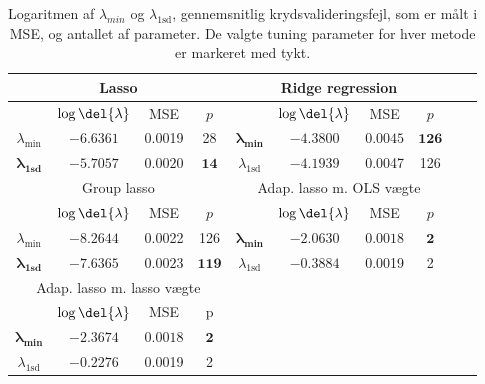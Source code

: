 \begin{table}[ht]
\center
\begin{tabular}{cccc | cccccc}
\toprule
   \multicolumn{4}{c}{Lasso} &  \multicolumn{4}{c}{Ridge regression}  \\ \midrule
 & \(\log \del{\lambda}\) & MSE & $p$ & & \(\log \del{\lambda}\) & MSE & $p$ \\
 $\lambda_{\min}$ &$-6.6361$& 0.0019 & 28 & $\boldsymbol{\lambda_{\min}}$ &  $\mathbf{-4.3800}$ &   $\mathbf{0.0045} $&  $\mathbf{126}$ \\ 
 $\boldsymbol{\lambda}_{\textbf{1sd}}$ & $\mathbf{-5.7057}$ & $\mathbf{0.0020} $& $\mathbf{14}$ & $\lambda_{ \text{1sd}}$& $-4.1939$ & 0.0047 & 126  \\ \bottomrule \toprule
\multicolumn{4}{c}{Group lasso}  &  \multicolumn{4}{c}{Adap. lasso m. OLS vægte}  \\ \midrule
& \(\log \del{\lambda}\) & MSE &$ p $ && \(\log \del{\lambda}\) & MSE & $p$ &  \\
$\lambda_{\min}$& $-8.2644$ & 0.0022  & 126 & $\boldsymbol{\lambda_{\min}}$  & $\mathbf{-2.0630}$ &$ \mathbf{0.0018}$ & $\mathbf{2}$ \\
  $\boldsymbol{\lambda}_{\textbf{1sd}}$  & $\mathbf{-7.6365}$ &$ \mathbf{0.0023}$ & $\mathbf{119}$ &  $\lambda_{1\text{sd}}$ & $-0.3884$ & 0.0019 & 2 \\  \bottomrule 
  \toprule
  \multicolumn{4}{c}{Adap. lasso m. lasso vægte}  \\ \cmidrule{1-4}
& \(\log \del{\lambda}\) & MSE & p \\
$\boldsymbol{\lambda_{\min}}$   &  $ \mathbf{-2.3674}$ & $ \mathbf{0.0018} $& $ \mathbf{2}$   \\
$\lambda_{1\text{sd}}$  & $-0.2276$ & 0.0019 & 2  \\ \cmidrule{1-4}
 \end{tabular}
\caption{Logaritmen af $\lambda_{min}$ og $\lambda_{1\text{sd}}$, gennemsnitlig krydsvalideringsfejl, som er målt i MSE, og antallet af parameter. De valgte tuning parameter for hver metode er markeret med tykt.} \label{tab:cv_tab}
\end{table}
